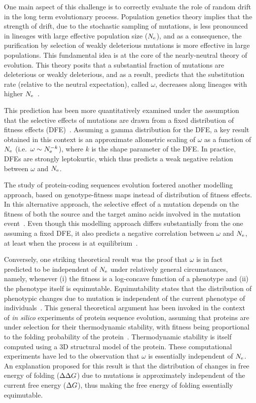 \documentclass{article}
\begin{document}
One main aspect of this challenge is to correctly evaluate the role of random drift in the long term evolutionary process.
Population genetics theory implies that the strength of drift, due to the stochastic sampling of mutations, is less pronounced in lineages with large {effective population size} ($N_{\text{e}}$), and as a consequence, the purification by selection of weakly deleterious mutations is more effective in large populations.
This fundamental idea is at the core of the {nearly-neutral} theory of evolution.
This theory posits that a substantial fraction of mutations are deleterious or weakly deleterious, and as a result, predicts that the {substitution} rate (relative to the {neutral} expectation), called $\omega$, decreases along lineages with higher $N_{\text{e}}$~\citep{Ohta1972, Ohta1992}.

This prediction has been more quantitatively examined under the assumption that the selective effects of mutations are drawn from a fixed distribution of fitness effects ({DFE})~\citep{Kimura1979, Welch2008}.
Assuming a gamma distribution for the {DFE}, a key result obtained in this context is an approximate allometric scaling of $\omega$ as a function of $N_{\text{e}}$ (i.e.~$\omega \sim N_{\text{e}}^{-k}$), where $k$ is the shape parameter of the {DFE}.
In practice, DFEs are strongly leptokurtic, which thus predicts a weak negative relation between $\omega$ and $N_{\text{e}}$.

The study of protein-coding sequences evolution fostered another modelling approach, based on genotype-fitness maps instead of distribution of fitness effects.
In this alternative approach, the selective effect of a mutation depends on the fitness of both the source and the target amino acids involved in the mutation event~\citep{Halpern1998, Rodrigue2010, Tamuri2012}.
Even though this modelling approach differs substantially from the one assuming a fixed {DFE}, it also predicts a negative correlation between $\omega$ and $N_{\text{e}}$, at least when the process is at equilibrium~\citep{Spielman2015, DosReis2015}.

Conversely, one striking theoretical result was the proof that $\omega$ is in fact predicted to be independent of $N_{\text{e}}$ under relatively general circumstances, namely, whenever (i) the fitness is a log-concave function of a {phenotype} and (ii) the {phenotype} itself is equimutable.
Equimutability states that the distribution of phenotypic changes due to mutation is independent of the current {phenotype} of individuals~\citep{Cherry1998}.
This general theoretical argument has been invoked in the context of \textit{in silico} experiments of protein sequence evolution, assuming that proteins are under selection for their thermodynamic stability, with fitness being proportional to the folding probability of the protein~\citep{Goldstein2013}.
Thermodynamic stability is itself computed using a 3D structural model of the protein.
These computational experiments have led to the observation that $\omega$ is essentially independent of $N_{\text{e}}$.
An explanation proposed for this result is that the distribution of changes in free energy of folding ($\Delta \Delta G$) due to mutations is approximately independent of the current free energy ($\Delta G$), thus making the free energy of folding essentially equimutable.
\end{document}
